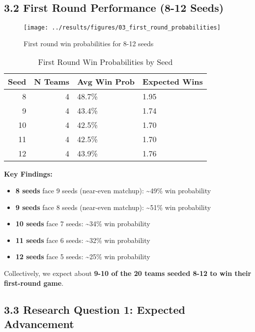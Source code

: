\documentclass[
]{article}
\providecommand{\tightlist}{%
  \setlength{\itemsep}{0pt}\setlength{\parskip}{0pt}}
\begin{document}
\subsection{3.2 First Round Performance (8-12
Seeds)}\label{first-round-performance-8-12-seeds}

\begin{figure}

{\centering \texttt{[image: ../results/figures/03\_first\_round\_probabilities]} 

}

\caption{First round win probabilities for 8-12 seeds}\label{fig:first-round-plot}
\end{figure}

\begin{longtable}[t]{rrll}
\caption{\label{tab:first-round-table}First Round Win Probabilities by Seed}\\
\toprule
Seed & N Teams & Avg Win Prob & Expected Wins\\
\midrule
8 & 4 & 48.7\% & 1.95\\
9 & 4 & 43.4\% & 1.74\\
10 & 4 & 42.5\% & 1.70\\
11 & 4 & 42.5\% & 1.70\\
12 & 4 & 43.9\% & 1.76\\
\bottomrule
\end{longtable}

\textbf{Key Findings:}

\begin{itemize}
\tightlist
\item
  \textbf{8 seeds} face 9 seeds (near-even matchup): \textasciitilde49\%
  win probability
\item
  \textbf{9 seeds} face 8 seeds (near-even matchup): \textasciitilde51\%
  win probability\\
\item
  \textbf{10 seeds} face 7 seeds: \textasciitilde34\% win probability
\item
  \textbf{11 seeds} face 6 seeds: \textasciitilde32\% win probability
\item
  \textbf{12 seeds} face 5 seeds: \textasciitilde25\% win probability
\end{itemize}

Collectively, we expect about \textbf{9-10 of the 20 teams seeded 8-12
to win their first-round game}.

\subsection{3.3 Research Question 1: Expected
Advancement}\label{research-question-1-expected-advancement}
\end{document}
